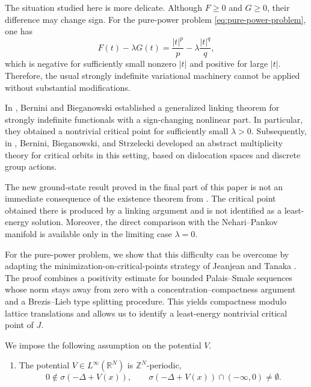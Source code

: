 \documentclass[11pt]{amsart}
\numberwithin{equation}{section}
\theoremstyle{definition}
\newcommand{\R}{\mathbb{R}}
\newcommand{\Z}{\mathbb{Z}}
\begin{document}
The situation studied here is more delicate. Although $F\geq 0$ and
$G\geq 0$, their difference may change sign. For the pure-power problem
\eqref{eq:pure-power-problem}, one has
\[
F(t)-\lambda G(t)
=
\frac{|t|^p}{p}
-
\lambda\frac{|t|^q}{q},
\]
which is negative for sufficiently small nonzero $|t|$ and positive for
large $|t|$. Therefore, the usual strongly indefinite variational
machinery cannot be applied without substantial modifications.

In \cite{BB2022}, Bernini and Bieganowski established a generalized
linking theorem for strongly indefinite functionals with a sign-changing
nonlinear part. In particular, they obtained a nontrivial critical point
for sufficiently small $\lambda>0$. Subsequently, in \cite{BBS2025},
Bernini, Bieganowski, and Strzelecki developed an abstract multiplicity
theory for critical orbits in this setting, based on dislocation spaces and
discrete group actions.

The new ground-state result proved in the final part of this paper is not
an immediate consequence of the existence theorem from \cite{BB2022}. The
critical point obtained there is produced by a linking argument and is not
identified as a least-energy solution. Moreover, the direct comparison with
the Nehari--Pankov manifold is available only in the limiting case
$\lambda=0$.

For the pure-power problem, we show that this difficulty can be overcome by adapting the minimization-on-critical-points strategy of Jeanjean and Tanaka \cite{JeanjeanTanaka}.
The proof combines a positivity estimate for bounded Palais--Smale
sequences whose norm stays away from zero with a
concentration--compactness argument and a Brezis--Lieb type splitting
procedure. This yields compactness modulo lattice translations and allows
us to identify a least-energy nontrivial critical point of $J$.



We impose the following assumption on the potential $V$.

\begin{enumerate} [label=(V),ref=V]
\item \label{ass:V}
The potential $V\in L^\infty(\R^N)$ is  $\Z^{N}$-periodic,
\[
0\notin\sigma\left(-\Delta+V(x)\right),
\qquad
\sigma\left(-\Delta+V(x)\right)\cap(-\infty,0)\ne\emptyset.
\]
\end{enumerate}
\end{document}
